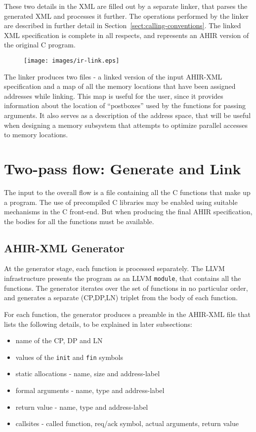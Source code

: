 \documentclass[12pt]{article}
\begin{document}
These two details in the XML are filled out by a separate linker, that
parses the generated XML and processes it further. The operations
performed by the linker are described in further detail in
Section~\ref{sect:calling-conventions}. The linked XML specification
is complete in all respects, and represents an AHIR version of the
original C program.

\begin{figure}[htb]
\centering
\texttt{[image: images/ir-link.eps]}
\end{figure}

The linker produces two files - a linked version of the input AHIR-XML
specification and a map of all the memory locations that have been
assigned addresses while linking. This map is useful for the user,
since it provides information about the location of ``postboxes'' used
by the functions for passing arguments. It also serves as a
description of the address space, that will be useful when designing a
memory subsystem that attempts to optimize parallel accesses to memory
locations.

\section{Two-pass flow: Generate and Link}

The input to the overall flow is a file containing all the C functions
that make up a program. The use of precompiled C libraries may be
enabled using suitable mechanisms in the C front-end. But when
producing the final AHIR specification, the bodies for all the
functions must be available.

\subsection{AHIR-XML Generator}

At the generator stage, each function is processed separately. The
LLVM infrastructure presents the program as an LLVM {\tt module}, that
contains all the functions. The generator iterates over the set of
functions in no particular order, and generates a separate (CP,DP,LN)
triplet from the body of each function.

For each function, the generator produces a preamble in the AHIR-XML
file that lists the following details, to be explained in later
subsections:
\begin{itemize}
\item name of the CP, DP and LN
\item values of the {\tt init} and {\tt fin} symbols
\item static allocations - name, size and address-label
\item formal arguments - name, type and address-label
\item return value - name, type and address-label
\item callsites - called function, req/ack symbol, actual arguments,
      return value
\end{itemize}
\end{document}
